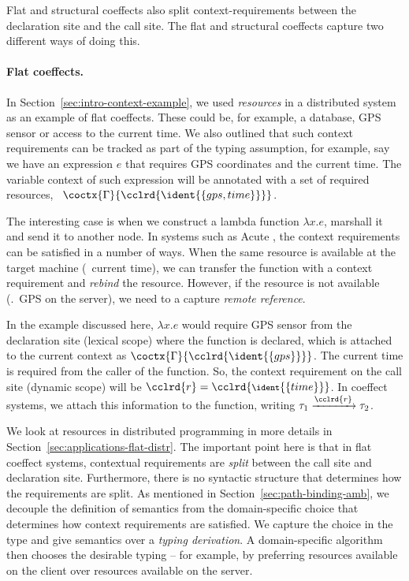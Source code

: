 Flat and structural coeffects also split context-requirements between the declaration site and
the call site. The flat and structural coeffects capture two different ways of doing this.

\paragraph{Flat coeffects.}

In Section~\ref{sec:intro-context-example}, we used \emph{resources} in a distributed system as an
example of flat coeffects. These could be, for example, a database, GPS sensor or access to the current
time. We also outlined that such context requirements can be tracked as part of the typing assumption,
for example, say we have an expression $e$ that requires GPS coordinates and the current time.
The variable context of such expression will be annotated with a set of required resources,
\ie~$\coctx{\Gamma}{ \cclrd{\ident{\{ gps, time \}}} }$.

The interesting case is when we construct a lambda function $\lambda x.e$, marshall it and
send it to another node. In systems such as Acute \cite{app-distributed-acute}, the context
requirements can be satisfied in a number of ways. When the same resource is available at the target
machine (\eg~current time), we can transfer the function with a context requirement and \emph{rebind}
the resource. However, if the resource is not available (\eg.~GPS on the server), we need to a
capture \emph{remote reference}.

In the example discussed here, $\lambda x.e$ would require GPS sensor from the declaration
site (lexical scope) where the function is declared, which is attached to the current context
as $\coctx{\Gamma}{ \cclrd{\ident{\{ gps \}}} }$. The current time is required from the caller
of the function. So, the context requirement on the call site (dynamic scope) will be
$\cclrd{r}=\cclrd{\footnotesize\ident{\{ time \}}}$. In coeffect systems, we attach this information
to the function, writing $\tau_1 \xrightarrow{ \cclrd{r} } \tau_2$.

We look at resources in distributed programming in more details in Section~\ref{sec:applications-flat-distr}.
The important point here is that in flat coeffect systems, contextual requirements are
\emph{split} between the call site and declaration site. Furthermore, there is no syntactic
structure that determines how the requirements are split. As mentioned in Section~\ref{sec:path-binding-amb},
we decouple the definition of semantics from the domain-specific choice that determines how
context requirements are satisfied. We capture the choice in the type and give semantics over a
\emph{typing derivation}. A domain-specific algorithm then chooses the desirable typing -- for
example, by preferring resources available on the client over resources available on the server.

